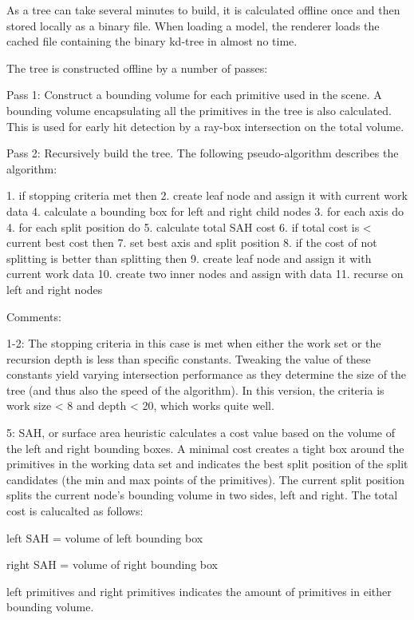 As a tree can take several minutes to build, it is calculated offline once and then stored locally as a binary file. When loading a model, the renderer loads the cached file containing the binary kd-tree in almost no time.

The tree is constructed offline by a number of passes:

Pass 1: Construct a bounding volume for each primitive used in the scene. A bounding volume encapsulating all the primitives in the tree is also calculated. This is used for early hit detection by a ray-box intersection on the total volume.

Pass 2: Recursively build the tree. The following pseudo-algorithm describes the algorithm:

 1. if stopping criteria met then 
 2.   create leaf node and assign it with current work data
 4. calculate a bounding box for left and right child nodes
 3. for each axis do
 4.  for each split position do
 5.    calculate total SAH cost
 6.    if total cost is < current best cost then
 7.      set best axis and split position
 8. if the cost of not splitting is better than splitting then
 9.   create leaf node and assign it with current work data
10. create two inner nodes and assign with data
11. recurse on left and right nodes

Comments: 

1-2: The stopping criteria in this case is met when either the work set or the recursion depth is less than specific constants. Tweaking the value of these constants yield varying intersection performance as they determine the size of the tree (and thus also the speed of the algorithm). In this version, the criteria is work size < 8 and depth < 20, which works quite well.

5: SAH, or surface area heuristic calculates a cost value based on the volume of the left and right bounding boxes. A minimal cost creates a tight box around the primitives in the working data set and indicates the best split position of the split candidates (the min and max points of the primitives). The current split position splits the current node's bounding volume in two sides, left and right. The total cost is calucalted as follows: 

left SAH = volume of left bounding box

right SAH = volume of right bounding box

left primitives and right primitives indicates the amount of primitives in either bounding volume. 

